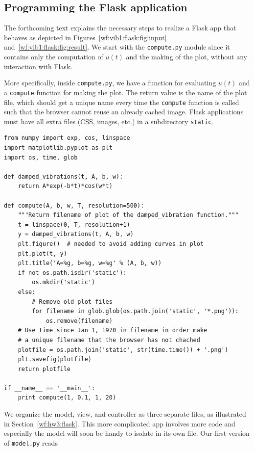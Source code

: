 \documentclass[%
oneside,                 %
final,                   %
10pt]{article}
\begin{document}
{\subsection{Programming the Flask application}



The forthcoming text explains the necessary steps to realize a
Flask app that behaves as depicted in Figures~\ref{wf:vib1:flask:fig:input}
and~\ref{wf:vib1:flask:fig:result}. We start with the
\Verb!compute.py! module since it contains only the computation of $u(t)$
and the making of the plot, without any interaction with Flask.

More specifically, inside \Verb!compute.py!, we have a function for
evaluating $u(t)$ and a \Verb!compute! function for making the plot. The
return value is the name of the plot file, which should get a unique
name every time the \Verb!compute! function is called such that the browser
cannot reuse an already cached image. Flask applications must have all
extra files (CSS, images, etc.) in a subdirectory \Verb!static!.

\begin{Verbatim}[numbers=none,fontsize=\fontsize{9pt}{9pt},baselinestretch=0.85]
from numpy import exp, cos, linspace
import matplotlib.pyplot as plt
import os, time, glob

def damped_vibrations(t, A, b, w):
    return A*exp(-b*t)*cos(w*t)

def compute(A, b, w, T, resolution=500):
    """Return filename of plot of the damped_vibration function."""
    t = linspace(0, T, resolution+1)
    y = damped_vibrations(t, A, b, w)
    plt.figure()  # needed to avoid adding curves in plot
    plt.plot(t, y)
    plt.title('A=%g, b=%g, w=%g' % (A, b, w))
    if not os.path.isdir('static'):
        os.mkdir('static')
    else:
        # Remove old plot files
        for filename in glob.glob(os.path.join('static', '*.png')):
            os.remove(filename)
    # Use time since Jan 1, 1970 in filename in order make
    # a unique filename that the browser has not chached
    plotfile = os.path.join('static', str(time.time()) + '.png')
    plt.savefig(plotfile)
    return plotfile

if __name__ == '__main__':
    print compute(1, 0.1, 1, 20)
\end{Verbatim}


We organize the model, view, and controller as three separate
files, as illustrated in
Section~\ref{wf:hw3:flask}. This more complicated app involves
more code and especially the model will soon be handy to isolate in its own
file. Our first version of \Verb!model.py! reads

}
\end{document}
